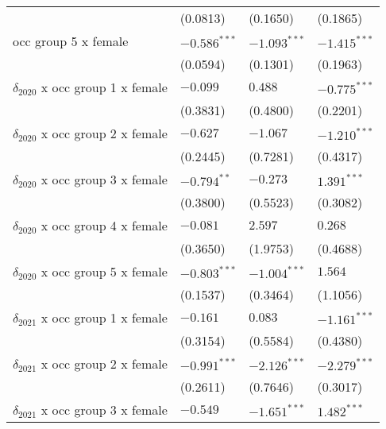 \begin{tabular}{llll}
                                       &           (0.0813) &           (0.1650) &           (0.1865) \\
occ group 5 x female                   &     $-0.586^{***}$ &     $-1.093^{***}$ &     $-1.415^{***}$ \\
                                       &           (0.0594) &           (0.1301) &           (0.1963) \\
$\delta_{2020}$ x occ group 1 x female &           $-0.099$ &            $0.488$ &     $-0.775^{***}$ \\
                                       &           (0.3831) &           (0.4800) &           (0.2201) \\
$\delta_{2020}$ x occ group 2 x female &           $-0.627$ &           $-1.067$ &     $-1.210^{***}$ \\
                                       &           (0.2445) &           (0.7281) &           (0.4317) \\
$\delta_{2020}$ x occ group 3 x female &      $-0.794^{**}$ &           $-0.273$ &      $1.391^{***}$ \\
                                       &           (0.3800) &           (0.5523) &           (0.3082) \\
$\delta_{2020}$ x occ group 4 x female &           $-0.081$ &            $2.597$ &            $0.268$ \\
                                       &           (0.3650) &           (1.9753) &           (0.4688) \\
$\delta_{2020}$ x occ group 5 x female &     $-0.803^{***}$ &     $-1.004^{***}$ &            $1.564$ \\
                                       &           (0.1537) &           (0.3464) &           (1.1056) \\
$\delta_{2021}$ x occ group 1 x female &           $-0.161$ &            $0.083$ &     $-1.161^{***}$ \\
                                       &           (0.3154) &           (0.5584) &           (0.4380) \\
$\delta_{2021}$ x occ group 2 x female &     $-0.991^{***}$ &     $-2.126^{***}$ &     $-2.279^{***}$ \\
                                       &           (0.2611) &           (0.7646) &           (0.3017) \\
$\delta_{2021}$ x occ group 3 x female &           $-0.549$ &     $-1.651^{***}$ &      $1.482^{***}$ \\

\end{tabular}
